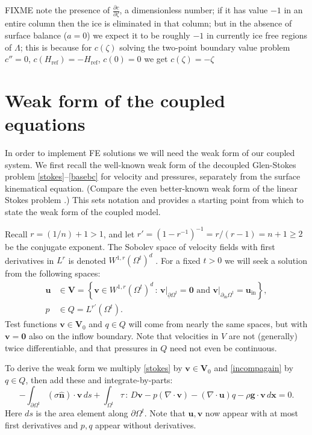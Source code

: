 \documentclass[letterpaper,final,12pt,reqno]{amsart}
\newcommand{\hbn}{\hat{\mathbf{n}}}
\newcommand{\bu}{\mathbf{u}}
\newcommand{\bv}{\mathbf{v}}
\newcommand{\bx}{\mathbf{x}}
\newcommand{\bV}{\mathbf{V}}
\newcommand{\bzero}{\bm{0}}
\newcommand{\Href}{H_{\text{ref}}}
\begin{document}
FIXME note the presence of $\frac{\partial c}{\partial \zeta}$, a dimensionless number; if it has value $-1$ in an entire column then the ice is eliminated in that column; but in the absence of surface balance ($a=0$) we expect it to be roughly $-1$ in currently ice free regions of $\Lambda$; this is because for $c(\zeta)$ solving the two-point boundary value problem $c''=0$, $c(\Href)=-\Href$, $c(0)=0$ we get $c(\zeta)=-\zeta$


\section{Weak form of the coupled equations} \label{sec:weakformcoupled}

In order to implement FE solutions we will need the weak form of our coupled system.  We first recall the well-known weak form of the decoupled Glen-Stokes problem \eqref{stokes}--\eqref{basebc} \cite{JouvetRappaz2011} for velocity and pressures, separately from the surface kinematical equation.  (Compare the even better-known weak form of the linear Stokes problem \cite{Bueler2021,Elmanetal2014}.)  This sets notation and provides a starting point from which to state the weak form of the coupled model.

Recall $r=(1/n) + 1>1$, and let $r'=(1-r^{-1})^{-1}=r/(r-1)=n+1\ge 2$ be the conjugate exponent.  The Sobolev space of velocity fields with first derivatives in $L^r$ is denoted $W^{1,r}(\Omega^t)^d$ \cite{Evans2010}.  For a fixed $t>0$ we will seek a solution from the following spaces:
\begin{align*}
\bu &\in \bV = \left\{\bv \in W^{1,r}(\Omega^t)^d\,:\,\bv\big|_{\underline{\partial} \Omega^t}=\bzero \text{ and } \bv\big|_{\partial_{\text{in}} \Omega^t} = \bu_{\text{in}}\right\}, \\
p &\in Q = L^{r'}(\Omega^t).
\end{align*}
Test functions $\bv \in \bV_0$ and $q\in Q$ will come from nearly the same spaces, but with $\bv=\bzero$ also on the inflow boundary.  Note that velocities in $V$ are not (generally) twice differentiable, and that pressures in $Q$ need not even be continuous.

To derive the weak form we multiply \eqref{stokes} by $\bv\in \bV_0$ and \eqref{incompagain} by $q\in Q$, then add these and integrate-by-parts:
\begin{equation}
-\int_{\partial\Omega^t} (\sigma \hbn)\cdot \bv\,ds + \int_{\Omega^t} \tau \,:\,D\bv - p (\nabla \cdot \bv) - \left(\nabla \cdot \bu\right) q - \rho \mathbf{g} \cdot \bv \,d\bx = 0. \label{nonfunctwo}
\end{equation}
Here $ds$ is the area element along $\partial\Omega^t$.  Note that $\bu,\bv$ now appear with at most first derivatives and $p,q$ appear without derivatives.
\end{document}
